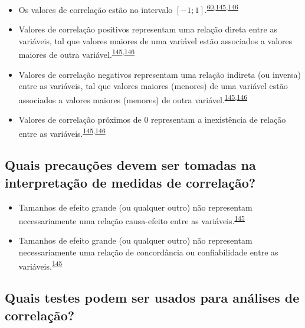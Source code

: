 \documentclass[
  a4paper,
]{book}
\begin{document}
\begin{itemize}
\item
  Os valores de correlação estão no intervalo \([-1; 1]\).\textsuperscript{\protect\hyperlink{ref-barkan2015}{60},\protect\hyperlink{ref-khamis2008}{145},\protect\hyperlink{ref-allison2022}{146}}
\item
  Valores de correlação positivos representam uma relação direta entre as variáveis, tal que valores maiores de uma variável estão associados a valores maiores de outra variável.\textsuperscript{\protect\hyperlink{ref-khamis2008}{145},\protect\hyperlink{ref-allison2022}{146}}
\item
  Valores de correlação negativos representam uma relação indireta (ou inversa) entre as variáveis, tal que valores maiores (menores) de uma variável estão associados a valores maiores (menores) de outra variável.\textsuperscript{\protect\hyperlink{ref-khamis2008}{145},\protect\hyperlink{ref-allison2022}{146}}
\item
  Valores de correlação próximos de \(0\) representam a inexistência de relação entre as variáveis.\textsuperscript{\protect\hyperlink{ref-khamis2008}{145},\protect\hyperlink{ref-allison2022}{146}}
\end{itemize}

\hypertarget{quais-precauuxe7uxf5es-devem-ser-tomadas-na-interpretauxe7uxe3o-de-medidas-de-correlauxe7uxe3o}{%
\subsection{Quais precauções devem ser tomadas na interpretação de medidas de correlação?}\label{quais-precauuxe7uxf5es-devem-ser-tomadas-na-interpretauxe7uxe3o-de-medidas-de-correlauxe7uxe3o}}

\begin{itemize}
\item
  Tamanhos de efeito grande (ou qualquer outro) não representam necessariamente uma relação causa-efeito entre as variáveis.\textsuperscript{\protect\hyperlink{ref-khamis2008}{145}}
\item
  Tamanhos de efeito grande (ou qualquer outro) não representam necessariamente uma relação de concordância ou confiabilidade entre as variáveis.\textsuperscript{\protect\hyperlink{ref-khamis2008}{145}}
\end{itemize}

\hypertarget{quais-testes-podem-ser-usados-para-anuxe1lises-de-correlauxe7uxe3o}{%
\subsection{Quais testes podem ser usados para análises de correlação?}\label{quais-testes-podem-ser-usados-para-anuxe1lises-de-correlauxe7uxe3o}}
\end{document}

